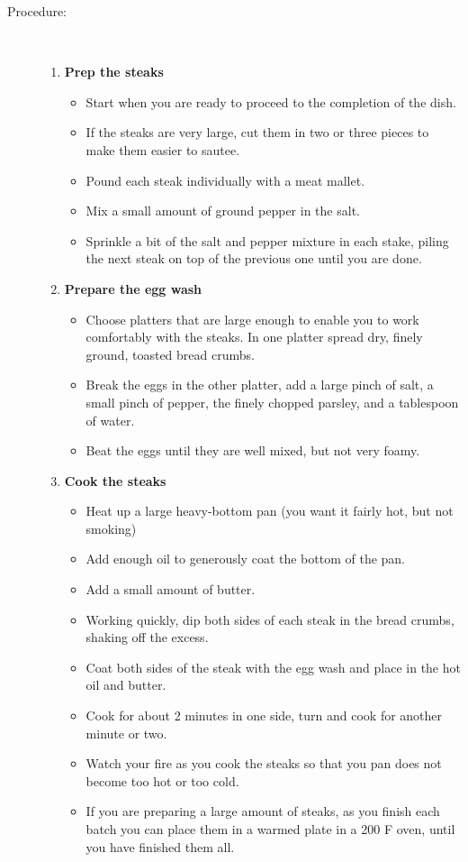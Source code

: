 \documentclass[11pt,letterpaper]{article}
\begin{document}
\begin{description}
\item[Procedure:]\ \\
	\begin{enumerate}
	\item {\bf Prep the steaks}
	\begin{itemize}
	\item Start when you are ready to proceed to the completion of the dish.
	\item If the steaks are very large, cut them in two or three pieces to make them easier to sautee.
	\item Pound each steak individually with a meat mallet.
	\item Mix a small amount of ground pepper in the salt.
	\item Sprinkle a bit of the salt and pepper mixture in each stake, piling the next steak on top of the previous one until you are done.
	\end{itemize}
	\item {\bf Prepare the egg wash}
	\begin{itemize}
	\item Choose platters that are large enough to enable you to work comfortably with the steaks. In one platter spread dry, finely ground, toasted bread crumbs.
	\item Break the eggs in the other platter, add a large pinch of salt, a small pinch of pepper, the finely chopped parsley, and a tablespoon of water. 
	\item Beat the eggs until they are well mixed, but not very foamy.
	\end{itemize}
	\item {\bf Cook the steaks}
	\begin{itemize}
	\item Heat up a large heavy-bottom pan (you want it fairly hot, but not smoking)
	\item Add enough oil to generously coat the bottom of the pan.
	\item Add a small amount of butter.
	\item Working quickly, dip both sides of each steak in the bread crumbs, shaking off the excess.
	\item Coat both sides of the steak with the egg wash and place in the hot oil and butter.
	\item Cook for about 2 minutes in one side, turn and cook for another minute or two.
	\item Watch your fire as you cook the steaks so that you pan does not become too hot or too cold.
	\item If you are preparing a large amount of steaks, as you finish each batch you can place them in a warmed plate in a 200 F oven, until you have finished them all.
	\end{itemize}
	\end{enumerate}
\end{description}
\end{document}
